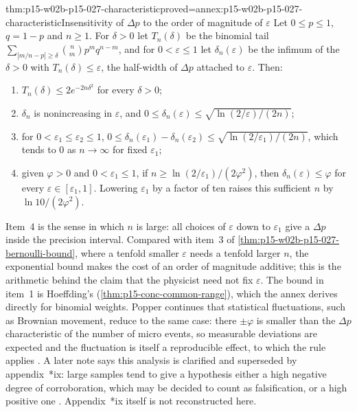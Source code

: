 \begin{hbtheorem}{thm:p15-w02b-p15-027-characteristic}{proved=annex:p15-w02b-p15-027-characteristic}{Insensitivity of \texorpdfstring{\(\Delta p\)}{Delta p} to the order of magnitude of \texorpdfstring{\(\varepsilon\)}{epsilon}}
Let \(0\leq p\leq1\), \(q=1-p\) and \(n\geq1\). For \(\delta>0\) let
\(T_n(\delta)\) be the binomial tail
\(\sum_{|m/n-p|\geq\delta}\binom{n}{m}p^mq^{n-m}\), and for
\(0<\varepsilon\leq1\) let \(\delta_n(\varepsilon)\) be the infimum of
the \(\delta>0\) with \(T_n(\delta)\leq\varepsilon\), the half-width of
\(\Delta p\) attached to \(\varepsilon\). Then:
\begin{enumerate}
\item \(T_n(\delta)\leq2e^{-2n\delta^2}\) for every \(\delta>0\);
\item \(\delta_n\) is nonincreasing in \(\varepsilon\), and
  \(0\leq\delta_n(\varepsilon)\leq\sqrt{\ln(2/\varepsilon)/(2n)}\);
\item for \(0<\varepsilon_1\leq\varepsilon_2\leq1\),
  \(0\leq\delta_n(\varepsilon_1)-\delta_n(\varepsilon_2)\leq
  \sqrt{\ln(2/\varepsilon_1)/(2n)}\), which tends to \(0\) as
  \(n\to\infty\) for fixed \(\varepsilon_1\);
\item given \(\varphi>0\) and \(0<\varepsilon_1\leq1\), if
  \(n\geq\ln(2/\varepsilon_1)/(2\varphi^2)\), then
  \(\delta_n(\varepsilon)\leq\varphi\) for every
  \(\varepsilon\in[\varepsilon_1,1]\). Lowering \(\varepsilon_1\) by a
  factor of ten raises this sufficient \(n\) by \(\ln10/(2\varphi^2)\).
\end{enumerate}
\end{hbtheorem}

Item~4 is the sense in which \(n\) is large: all choices of
\(\varepsilon\) down to \(\varepsilon_1\) give a \(\Delta p\) inside the
precision interval. Compared with item~3 of
\cref{thm:p15-w02b-p15-027-bernoulli-bound}, where a tenfold smaller
\(\varepsilon\) needs a tenfold larger \(n\), the exponential bound makes
the cost of an order of magnitude additive; this is the arithmetic
behind the claim that the physicist need not fix \(\varepsilon\). The
bound in item~1 is Hoeffding's (\cref{thm:p15-conc-common-range}), which
the annex derives directly for binomial weights. Popper continues that
statistical fluctuations, such as Brownian movement, reduce to the same
case: there \(\pm\varphi\) is smaller than the \(\Delta p\) characteristic
of the number of micro events, so measurable deviations are expected and
the fluctuation is itself a reproducible effect, to which the rule
applies \parencite[\S68, p.~196]{Popper2002LogicDiscoveryUI}. A later note says this
analysis is clarified and superseded by appendix~*ix: large samples tend
to give a hypothesis either a high negative degree of corroboration,
which may be decided to count as falsification, or a high positive one
\parencite[\S68, note~*4]{Popper2002LogicDiscoveryUI}. Appendix~*ix
itself is not reconstructed here.

